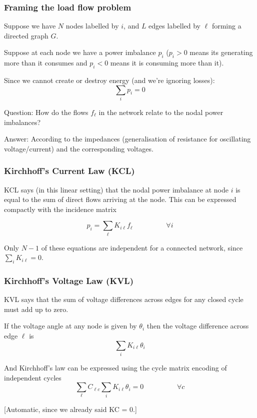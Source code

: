 \documentclass[10pt,aspectratio=169,dvipsnames]{beamer}
\begin{document}
\begin{frame}
  \frametitle{Framing the load flow problem}

  Suppose we have $N$ nodes labelled by $i$, and $L$ edges labelled by
  $\ell$ forming a directed graph $G$.

  Suppose at each node we have a \alert{power imbalance} $p_i$ ($p_i >
  0$ means its generating more than it consumes and $p_i < 0$ means it
  is consuming more than it).

  Since we cannot create or destroy energy (and we're ignoring losses):
  \begin{equation*}
    \sum_i p_i = 0
  \end{equation*}

  \alert{Question}: How do the flows $f_\ell$ in the network relate to the nodal power
  imbalances?

  \alert{Answer}: According to the impedances (generalisation of
  resistance for oscillating voltage/current) and the corresponding
  voltages.

\end{frame}



\begin{frame}
  \frametitle{Kirchhoff's Current Law (KCL)}

  KCL says (in this linear setting) that the nodal power imbalance at
  node $i$ is equal to the sum of direct flows arriving at the
  node. This can be expressed compactly with the incidence matrix

  \begin{equation*}
    p_i = \sum_\ell K_{i\ell} f_\ell \hspace{2cm} \forall i
  \end{equation*}


  Only $N-1$ of these equations are independent for a connected network, since $\sum_i K_{i\ell} = 0$.
\end{frame}


\begin{frame}
  \frametitle{Kirchhoff's Voltage Law (KVL)}

  KVL says that the sum of voltage differences across edges for any
  closed cycle must add up to zero.

  If the voltage angle at any node is given by $\theta_i$ then the voltage difference across edge $\ell$ is
  \begin{equation*}
    \sum_i K_{i\ell} \theta_i
  \end{equation*}

  And Kirchhoff's law can be expressed using the cycle matrix encoding of independent cycles
  \begin{equation*}
    \sum_\ell C_{\ell c} \sum_i K_{i\ell} \theta_i = 0 \hspace{2cm} \forall c
  \end{equation*}

  [Automatic, since we already said KC = 0.]


\end{frame}
\end{document}
